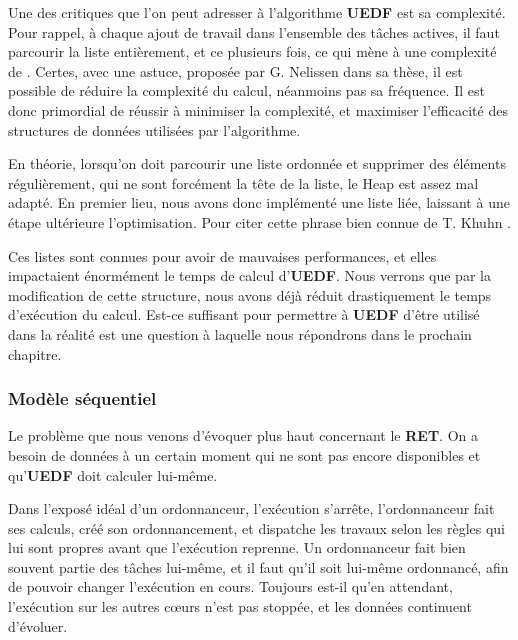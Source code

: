 		
		Une des critiques que l'on peut adresser à l'algorithme \textbf{UEDF} est sa complexité. 
		Pour rappel, à chaque ajout de travail dans l'ensemble des tâches actives, il faut 
		parcourir la liste entièrement, et ce plusieurs fois, ce qui mène à 
		une complexité de . 
		Certes, avec une astuce, proposée par G. Nelissen dans sa thèse, il est possible de réduire 
		la complexité du calcul, néanmoins pas sa fréquence. Il est donc primordial de réussir à 
		minimiser la complexité, et maximiser l'efficacité des structures de données utilisées par l'algorithme.\newline
		
		
		En théorie, lorsqu'on doit parcourir une liste ordonnée et supprimer des éléments régulièrement, 
		qui ne sont forcément la tête de la liste, le Heap est assez mal adapté. En premier lieu, 
		nous avons donc implémenté une liste liée, laissant à une étape ultérieure l'optimisation. 
		Pour citer cette phrase bien connue de T. Khuhn .
		
		Ces listes sont connues pour avoir de mauvaises 
		performances, et elles impactaient énormément le temps de calcul d'\textbf{UEDF}. 
		Nous verrons que par la modification de cette structure, nous avons déjà réduit drastiquement 
		le temps d'exécution du calcul. Est-ce suffisant pour permettre à \textbf{UEDF} d'être utilisé dans la réalité est une question à laquelle nous répondrons dans le prochain chapitre.
		
	\subsubsection{Modèle séquentiel}
	
		Le problème que nous venons d'évoquer plus haut concernant le \textbf{RET}. On a besoin de données 
		à un certain moment qui ne sont pas encore disponibles et qu'\textbf{UEDF} doit calculer lui-même. 
		
		Dans l'exposé idéal d'un ordonnanceur, l'exécution s'arrête, l'ordonnanceur fait ses calculs, créé son 
		ordonnancement, et dispatche les travaux selon les règles qui lui sont propres avant que l'exécution reprenne. 
		Un ordonnanceur fait bien souvent partie des tâches lui-même, et il faut qu'il soit lui-même ordonnancé, 
		afin de pouvoir changer l'exécution en cours. Toujours est-il qu'en attendant, l'exécution sur les autres cœurs 
		n'est pas stoppée, et les données continuent d'évoluer. 
		
